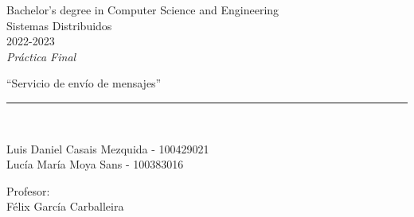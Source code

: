 \def\degree{Bachelor's degree in Computer Science and Engineering}
\def\subject{Sistemas Distribuidos}
\def\year{2022-2023}
\def\labType{Práctica Final}
\def\labName{Servicio de envío de mensajes}
\def\proffesor{Félix García Carballeira}

\begin{titlepage}
	\begin{sffamily}
	\color{azulUC3M}
	\begin{center}

		\begin{figure}[H]
		\end{figure}
		\vspace{1.5cm}

		\begin{Large}
			\degree\\
            \subject\\
			\year\\
			\vspace{2cm}		
			\textsl{\labType}
			\bigskip
			
		\end{Large}

		{\Huge ``\labName''}\\

		\vspace*{0.5cm}
		\rule{10.5cm}{0.1mm}\\
		\vspace*{0.9cm}
		
		{\LARGE Luis Daniel Casais Mezquida - 100429021}\\
		\vspace*{0.2cm}
		{\LARGE Lucía María Moya Sans - 100383016}\\
        \vspace*{0.2cm}

		\vspace*{0.8cm}
		
		\begin{Large}
		    Profesor:\\
			\proffesor\\
		\end{Large}

	\end{center}
	\vfill
	\end{sffamily}
\end{titlepage}